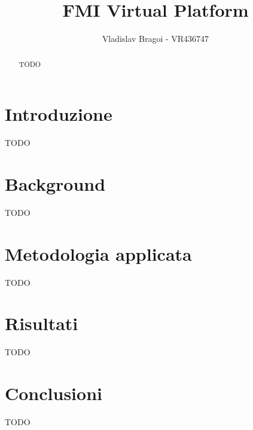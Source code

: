 \documentclass[]{IEEEtran}
\title{FMI Virtual Platform}
\author{Vladislav Bragoi - VR436747}
\begin{document}
\maketitle

\begin{abstract}
TODO

\end{abstract}

\section{Introduzione} \label{sec:intro}
TODO

\section{Background}
TODO

\section{Metodologia applicata}
TODO

\section{Risultati}
TODO

\section{Conclusioni}
TODO

% 
% 
\end{document}
